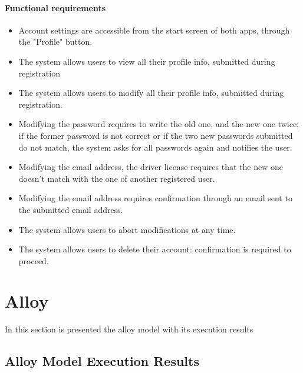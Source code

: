 \paragraph{Functional requirements }
\begin{itemize}
	\item Account settings are accessible from the start screen of both apps, through the "Profile" button.
	\item The system allows users to view all their profile info, submitted during registration
	\item The system allows users to modify all their profile info, submitted during registration.
	\item Modifying the password requires to write the old one, and the new one twice; if the former password is not correct or if the two new passwords submitted do not match, the system asks for all passwords again and notifies the user.
	\item Modifying the email address, the driver license requires that the new one doesn't match with the one of another registered user.
	\item Modifying the email address requires confirmation through an email sent to the submitted email address.
	\item The system allows users to abort modifications at any time.
	\item The system allows users to delete their account: confirmation is required to proceed.
\end{itemize}
\newpage

\section{Alloy}
In this section is presented the alloy model with its execution results
\newpage

\subsection{Alloy Model Execution Results}
\begin{itemize}
	\\
		\newpage
	\\
    \newpage
	\\
    \newpage
\end{itemize}
